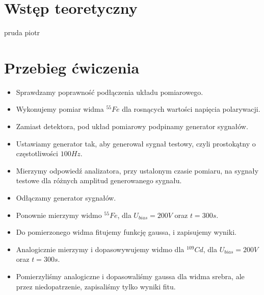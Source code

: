 \documentclass[11pt,a4paper]{article}
\begin{document}
\section{Wstęp teoretyczny}
pruda piotr
\section{Przebieg ćwiczenia}
\begin{itemize}
\item Sprawdzamy poprawność podłączenia układu pomiarowego.
\item Wykonujemy pomiar widma $^{55}Fe$ dla rosnących wartości napięcia polarywacji.
\item Zamiast detektora, pod układ pomiarowy podpinamy generator sygnałów.
\item Ustawiamy generator tak, aby generował sygnał testowy, czyli prostokątny o częstotliwości $100Hz$.
\item Mierzymy odpowiedź analizatora, przy ustalonym czasie pomiaru, na sygnały testowe dla różnych amplitud generowanego sygnału.
\item Odłączamy generator sygnałów.
\item Ponownie mierzymy widmo $^{55}Fe$, dla $U_{bias} = 200V$ oraz $t=300s$.
\item Do pomierzonego widma fitujemy funkcję gaussa, i zapisujemy wyniki.
\item Analogicznie mierzymy i dopasowywujemy widmo dla $^{109}Cd$, dla $U_{bias} = 200V$ oraz $t=300s$.
\item Pomierzyliśmy analogiczne i dopasowaliśmy gaussa dla widma srebra, ale przez niedopatrzenie, zapisaliśmy tylko wyniki fitu.
\end{itemize}

\end{document}
